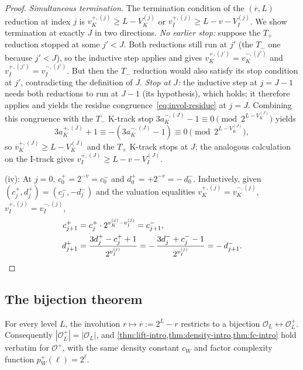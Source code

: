\documentclass[11pt,reqno]{amsart}
\newcommand{\Tplus}{T_{+}}
\newcommand{\Tminus}{T_{-}}
\newcommand{\Obs}{\mathcal{O}}
\newcommand{\Vk}{V_{K}}
\newcommand{\Vi}{V_{I}}
\newcommand{\vk}{v_{K}}
\newcommand{\vi}{v_{I}}
\begin{document}
\begin{proof}
\emph{Simultaneous termination.} The termination condition of the
$(\overline{r}, L)$ reduction at index $j$ is
$\vk^{+,(j)} \ge L - \Vk^{(j)}$ or $\vi^{+,(j)} \ge L - v - \Vi^{(j)}$.
We show termination at exactly $J$ in two directions. \emph{No earlier
stop:} suppose the $\Tplus$ reduction stopped at some $j' < J$. Both
reductions still run at $j'$ (the $\Tminus$ one because $j' < J$), so the
inductive step applies and gives $\vk^{+,(j')} = \vk^{-,(j')}$ and
$\vi^{+,(j')} = \vi^{-,(j')}$. But then the $\Tminus$ reduction would also
satisfy its stop condition at $j'$, contradicting the definition
of $J$. \emph{Stop at $J$:} the inductive step at $j = J - 1$ needs both
reductions to run at $J - 1$ (its hypothesis), which holds; it therefore
applies and yields the residue congruence~\eqref{eq:invol-residue} at $j = J$.
Combining this congruence with the
$\Tminus$ K-track stop
$3 a_K^{-,(J)} - 1 \equiv 0 \pmod{2^{L - \Vk^{(J)}}}$ yields
\[
3 a_K^{+,(J)} + 1 \equiv -(3 a_K^{-,(J)} - 1) \equiv 0 \pmod{2^{L - \Vk^{(J)}}},
\]
so $\vk^{+,(J)} \ge L - \Vk^{(J)}$ and the $\Tplus$ K-track stops at $J$; the
analogous calculation on the I-track gives
$\vi^{+,(J)} \ge L - v - \Vi^{(J)}$.

(iv): At $j = 0$, $c_0^{+} = 2^{-v} = c_0^{-}$ and
$d_0^{+} = +2^{-v} = -\, d_0^{-}$. Inductively, given
$(c_j^{+}, d_j^{+}) = (c_j^{-}, -d_j^{-})$ and the valuation equalities
$\vk^{+,(j)} = \vk^{-,(j)}$, $\vi^{+,(j)} = \vi^{-,(j)}$,
\begin{align*}
c_{j+1}^{+} &= c_j^{+} \cdot 2^{\vk^{(j)} - \vi^{(j)}} = c_{j+1}^{-}, \\
d_{j+1}^{+} &= \frac{3 d_j^{+} - c_j^{+} + 1}{2^{\vi^{(j)}}}
  = -\,\frac{3 d_j^{-} + c_j^{-} - 1}{2^{\vi^{(j)}}}
  = -\, d_{j+1}^{-}. \qedhere
\end{align*}
\end{proof}

\subsection{The bijection theorem}

\begin{theorem}\label{thm:tplus-bijection}
For every level $L$, the involution $r \mapsto \overline{r} := 2^L - r$
restricts to a bijection $\Obs_L \leftrightarrow \Obs_L^{+}$.
Consequently $|\Obs_L^{+}| = |\Obs_L|$, and
\cref{thm:lift-intro,thm:density-intro,thm:fc-intro}
hold verbatim for $\Obs^{+}$, with the same density constant $c_W$ and
factor complexity function $p_W^{+}(\ell) = 2^\ell$.
\end{theorem}
\end{document}
